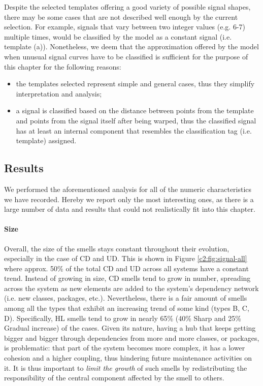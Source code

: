 Despite the selected templates offering a good variety of possible signal shapes, there may be some cases that are not described well enough by the current selection. For example, signals that vary between two integer values (e.g. 6-7) multiple times, would be classified by the model as a constant signal (i.e. template (a)).
Nonetheless, we deem that the approximation offered by the model when unusual signal curves have to be classified is sufficient for the purpose of this chapter for the following reasons:
\begin{itemize}
    \item the templates selected represent simple and general cases, thus they simplify interpretation and analysis;
    \item a signal is classified based on the distance between points from the template and points from the signal itself after being warped, thus the classified signal has at least an internal component that resembles the classification tag (i.e. template) assigned.
\end{itemize}

\subsection{Results}
We performed the aforementioned analysis for all of the numeric characteristics we have recorded.
Hereby we report only the most interesting ones, as there is a large number of data and results that could not realistically fit into this chapter.
\paragraph{Size}
Overall, the size of the smells stays constant throughout their evolution, especially in the case of CD and UD. This is shown in Figure \ref{c2:fig:signal-all} where approx. 50\% of the total CD and UD across all systems have a constant trend.
Instead of growing in size, CD smells tend to grow in number, spreading across the system as new elements are added to the system's dependency network (i.e. new classes, packages, etc.).
Nevertheless, there is a fair amount of smells among all the types that exhibit an increasing trend of some kind (types B, C, D).
Specifically, HL smells tend to grow in nearly 65\% (40\% Sharp and 25\% Gradual increase) of the cases. Given its nature, having a hub that keeps getting bigger and bigger through dependencies from more and more classes, or packages, is problematic: that part of the system becomes more complex, it has a lower cohesion and a higher coupling, thus hindering future maintenance activities on it.
It is thus important to \emph{limit the growth} of such smells by redistributing the responsibility of the central component affected by the smell to others.

